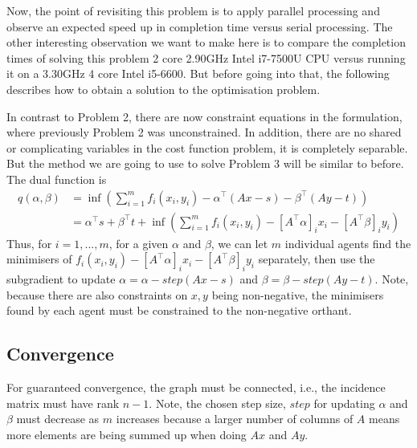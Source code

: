 \documentclass[12pt]{article}
\begin{document}
Now, the point of revisiting this problem is to apply parallel processing and observe an expected speed up in completion time versus serial processing. The other interesting observation we want to make here is to compare the completion times of solving this problem 2 core 2.90GHz Intel i7-7500U CPU versus running it on a 3.30GHz 4 core Intel i5-6600. But before going into that, the following describes how to obtain a solution to the optimisation problem.

In contrast to Problem 2, there are now constraint equations in the formulation, where previously Problem 2 was unconstrained. In addition, there are no shared or complicating variables in the cost function problem, it is completely separable. But the method we are going to use to solve Problem 3 will be similar to before. The dual function is
\begin{align*}
q(\alpha,\beta)&=\inf\left(\sum\limits_{i=1}^m f_i(x_i,y_i)-\alpha^\top (Ax-s)-\beta^\top(Ay-t)\right)\\
&=\alpha^\top s+\beta^\top t + \inf\left(\sum\limits_{i=1}^m f_i(x_i,y_i)-[A^\top\alpha]_ix_i-[A^\top \beta]_iy_i\right)
\end{align*}
Thus, for $i=1,...,m$, for a given $\alpha$ and $\beta$, we can let $m$ individual agents find the minimisers of $f_i(x_i,y_i)-[A^\top\alpha]_ix_i-[A^\top \beta]_iy_i$ separately, then use the subgradient to update $\alpha=\alpha-step(Ax-s)$ and $\beta=\beta-step(Ay-t)$. Note, because there are also constraints on $x,y$ being non-negative, the minimisers found by each agent must be constrained to the non-negative orthant. 


\subsection*{Convergence}

For guaranteed convergence, the graph must be connected, i.e., the incidence matrix must have rank $n-1$. Note, the chosen step size, $step$ for updating $\alpha$ and $\beta$ must decrease as $m$ increases because a larger number of columns of $A$ means more elements are being summed up when doing $Ax$ and $Ay$.
\end{document}
